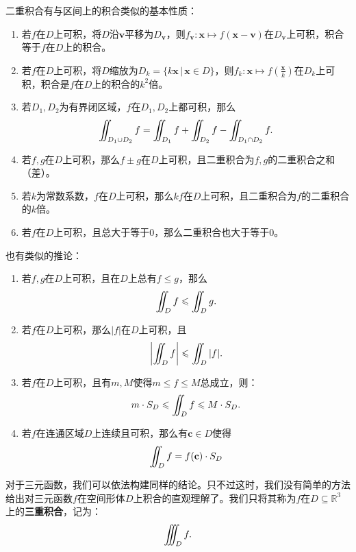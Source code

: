 \documentclass[12pt,UTF8]{ctexbook}
\begin{document}
二重积合有与区间上的积合类似的基本性质：
\begin{enumerate}[label=\arabic*.]
    \item 若$f$在$D$上可积，将$D$沿$\mathbf{v}$平移为$D_{\mathbf{v}}$，则$f_{\mathbf{v}}: \mathbf{x} \mapsto f(\mathbf{x}-\mathbf{v})$在$D_{\mathbf{v}}$上可积，积合等于$f$在$D$上的积合。
    \item 若$f$在$D$上可积，将$D$缩放为$D_{k}=\{k\mathbf{x}\,|\,\mathbf{x}\in D\}$，则$f_k: \mathbf{x}\mapsto f(\frac{\mathbf{x}}{k})$在$D_k$上可积，积合是$f$在$D$上的积合的$k^2$倍。
    \item 若$D_1,D_2$为有界闭区域，$f$在$D_1,D_2$上都可积，那么
    $$ \jii_{D_1\cup D_2} f = \jii_{D_1} f + \jii_{D_2} f - \jii_{D_1\cap D_2} f.$$
    \item 若$f,g$在$D$上可积，那么$f\pm g$在$D$上可积，且二重积合为$f,g$的二重积合之和（差）。
    \item 若$k$为常数系数，$f$在$D$上可积，那么$kf$在$D$上可积，且二重积合为$f$的二重积合的$k$倍。
    \item 若$f$在$D$上可积，且总大于等于$0$，那么二重积合也大于等于$0$。
\end{enumerate}
也有类似的推论：
\begin{enumerate}[label=\arabic*.]
    \item 若$f,g$在$D$上可积，且在$D$上总有$f\leqslant g$，那么
    $$ \jii_{D} f \leqslant \jii_{D} g. $$
    \item 若$f$在$D$上可积，那么$|f|$在$D$上可积，且
    $$ \left|\jii_{D} f\right| \leqslant \jii_{D} |f|. $$
    \item 若$f$在$D$上可积，且有$m,M$使得$m\leqslant f\leqslant M$总成立，则：
    $$ m\cdot S_D\leqslant \int\!\!\!\!\!\int_{D} f \leqslant M\cdot S_D. $$
    \item 若$f$在连通区域$D$上连续且可积，那么有$\mathbf{c}\in D$使得
    $$ \int\!\!\!\!\!\int_{D} f = f(\mathbf{c}) \cdot S_D $$
\end{enumerate}

对于三元函数，我们可以依法构建同样的结论。只不过这时，我们没有简单的方法给出对三元函数$f$在空间形体$D$上积合的直观理解了。我们只将其称为$f$在$D\subseteq \mathbb{R}^3$上的\textbf{三重积合}，记为：
$$ \jiii_{D} f. $$ 

\end{document}
